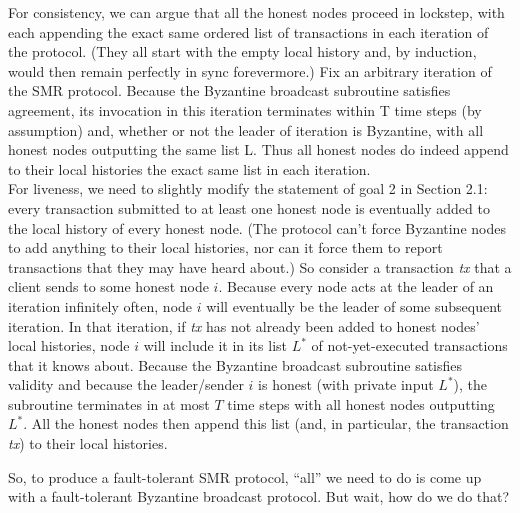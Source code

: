  \begin{myproof}
For consistency, we can argue that all the honest nodes proceed in lockstep, with
each appending the exact same ordered list of transactions in each iteration of the protocol.
(They all start with the empty local history and, by induction, would then remain perfectly
in sync forevermore.) Fix an arbitrary iteration of the SMR protocol. Because the Byzantine
broadcast subroutine satisfies agreement, its invocation in this iteration terminates within T
time steps (by assumption) and, whether or not the leader of iteration is Byzantine, with all
honest nodes outputting the same list L. Thus all honest nodes do indeed append to their
local histories the exact same list in each iteration.\\
For liveness, we need to slightly modify the statement of goal 2 in Section 2.1: every
transaction submitted to at least one honest node is eventually added to the local history of
every honest node. (The protocol can’t force Byzantine nodes to add anything to their local
histories, nor can it force them to report transactions that they may have heard about.) So consider a transaction \textit{tx} that a client sends to some honest node $i$. Because every node
acts at the leader of an iteration infinitely often, node $i$ will eventually be the leader of some
subsequent iteration. In that iteration, if \textit{tx} has not already been added to honest nodes’
local histories, node $i$ will include it in its list $L^*$ of not-yet-executed transactions that it
knows about. Because the Byzantine broadcast subroutine satisfies validity and because the
leader/sender $i$ is honest (with private input $L^*$), the subroutine terminates in at most $T$
time steps with all honest nodes outputting $L^*$. All the honest nodes then append this list
(and, in particular, the transaction \textit{tx}) to their local histories.
 \end{myproof}

So, to produce a fault-tolerant SMR protocol, “all” we need to do is come up with a
fault-tolerant Byzantine broadcast protocol. But wait, how do we do that?\\



